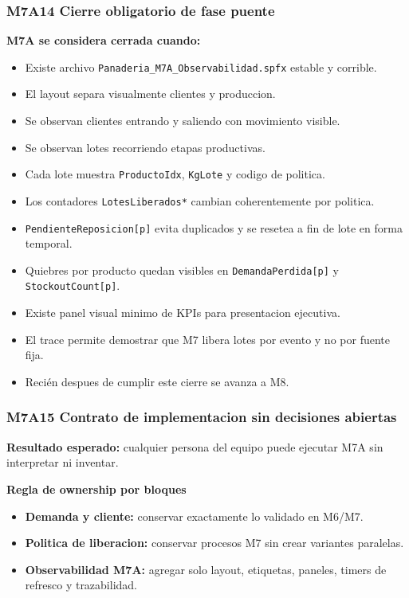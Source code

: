 \documentclass[11pt]{article}
\newcommand{\simio}[1]{\texttt{#1}}
\newcommand{\state}[1]{\texttt{#1}}
\begin{document}
\subsubsection{M7A14 Cierre obligatorio de fase puente}
\textbf{M7A se considera cerrada cuando:}
\begin{itemize}
  \item Existe archivo \simio{Panaderia\_M7A\_Observabilidad.spfx} estable y corrible.
  \item El layout separa visualmente clientes y produccion.
  \item Se observan clientes entrando y saliendo con movimiento visible.
  \item Se observan lotes recorriendo etapas productivas.
  \item Cada lote muestra \state{ProductoIdx}, \state{KgLote} y codigo de politica.
  \item Los contadores \state{LotesLiberados*} cambian coherentemente por politica.
  \item \state{PendienteReposicion[p]} evita duplicados y se resetea a fin de lote en forma temporal.
  \item Quiebres por producto quedan visibles en \state{DemandaPerdida[p]} y \state{StockoutCount[p]}.
  \item Existe panel visual minimo de KPIs para presentacion ejecutiva.
  \item El trace permite demostrar que M7 libera lotes por evento y no por fuente fija.
  \item Recién despues de cumplir este cierre se avanza a M8.
\end{itemize}

\subsubsection{M7A15 Contrato de implementacion sin decisiones abiertas}
\textbf{Resultado esperado:} cualquier persona del equipo puede ejecutar M7A sin interpretar ni inventar.

\textbf{Regla de ownership por bloques}
\begin{itemize}
  \item \textbf{Demanda y cliente:} conservar exactamente lo validado en M6/M7.
  \item \textbf{Politica de liberacion:} conservar procesos M7 sin crear variantes paralelas.
  \item \textbf{Observabilidad M7A:} agregar solo layout, etiquetas, paneles, timers de refresco y trazabilidad.
\end{itemize}
\end{document}
